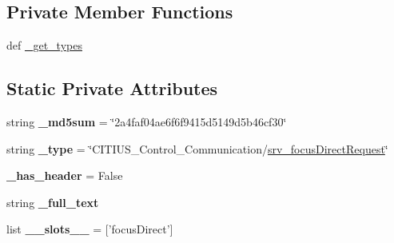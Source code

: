 \subsection*{\-Private \-Member \-Functions}
\begin{DoxyCompactItemize}
\item 
def \hyperlink{class_c_i_t_i_u_s___control___communication_1_1srv_1_1__srv__focus_direct_1_1srv__focus_direct_request_a52d3a50002ab2b587e1617f3bd28ca40}{\-\_\-get\-\_\-types}
\end{DoxyCompactItemize}
\subsection*{\-Static \-Private \-Attributes}
\begin{DoxyCompactItemize}
\item 
\hypertarget{class_c_i_t_i_u_s___control___communication_1_1srv_1_1__srv__focus_direct_1_1srv__focus_direct_request_ad150790a37026feaf2c6f44d7f0343a5}{string {\bfseries \-\_\-md5sum} = \char`\"{}2a4faf04ae6f6f9415d5149d5b46cf30\char`\"{}}\label{class_c_i_t_i_u_s___control___communication_1_1srv_1_1__srv__focus_direct_1_1srv__focus_direct_request_ad150790a37026feaf2c6f44d7f0343a5}

\item 
\hypertarget{class_c_i_t_i_u_s___control___communication_1_1srv_1_1__srv__focus_direct_1_1srv__focus_direct_request_aa479de39b81fa99fe7d68fc26e1de60a}{string {\bfseries \-\_\-type} = \char`\"{}\-C\-I\-T\-I\-U\-S\-\_\-\-Control\-\_\-\-Communication/\hyperlink{class_c_i_t_i_u_s___control___communication_1_1srv_1_1__srv__focus_direct_1_1srv__focus_direct_request}{srv\-\_\-focus\-Direct\-Request}\char`\"{}}\label{class_c_i_t_i_u_s___control___communication_1_1srv_1_1__srv__focus_direct_1_1srv__focus_direct_request_aa479de39b81fa99fe7d68fc26e1de60a}

\item 
\hypertarget{class_c_i_t_i_u_s___control___communication_1_1srv_1_1__srv__focus_direct_1_1srv__focus_direct_request_ae56ccc205a212c75352b7a24f92d46a5}{{\bfseries \-\_\-has\-\_\-header} = \-False}\label{class_c_i_t_i_u_s___control___communication_1_1srv_1_1__srv__focus_direct_1_1srv__focus_direct_request_ae56ccc205a212c75352b7a24f92d46a5}

\item 
string {\bfseries \-\_\-full\-\_\-text}
\item 
\hypertarget{class_c_i_t_i_u_s___control___communication_1_1srv_1_1__srv__focus_direct_1_1srv__focus_direct_request_ad37d74184f50b7c4ed5a5810e37d0338}{list {\bfseries \-\_\-\-\_\-slots\-\_\-\-\_\-} = \mbox{[}'focus\-Direct'\mbox{]}}\label{class_c_i_t_i_u_s___control___communication_1_1srv_1_1__srv__focus_direct_1_1srv__focus_direct_request_ad37d74184f50b7c4ed5a5810e37d0338}


\end{DoxyCompactItemize}
